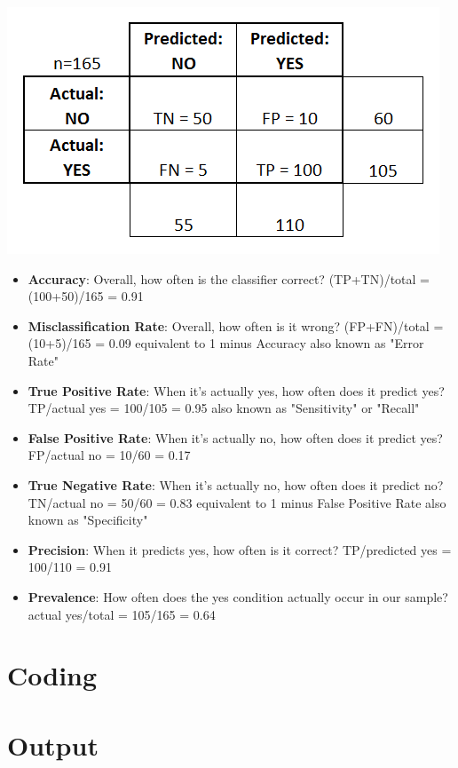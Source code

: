 \documentclass[a4paper,10pt]{article}
\begin{document}
\includegraphics[scale=0.70]{confusion_matrix.png}
\begin{itemize}
	\item \textbf{Accuracy}: Overall, how often is the classifier correct?
				(TP+TN)/total = (100+50)/165 = 0.91
     \item \textbf{Misclassification Rate}: Overall, how often is it wrong?
				(FP+FN)/total = (10+5)/165 = 0.09
                equivalent to 1 minus Accuracy
                also known as "Error Rate"
\item \textbf{True Positive Rate}: When it's actually yes, how often does it predict yes?
				TP/actual yes = 100/105 = 0.95
				also known as "Sensitivity" or "Recall"
\item \textbf{False Positive Rate}: When it's actually no, how often does it predict yes?
				FP/actual no = 10/60 = 0.17
\item \textbf{True Negative Rate}: When it's actually no, how often does it predict no?
				TN/actual no = 50/60 = 0.83
				equivalent to 1 minus False Positive Rate
				also known as "Specificity"
\item \textbf{Precision}: When it predicts yes, how often is it correct?
				TP/predicted yes = 100/110 = 0.91
\item \textbf{Prevalence}: How often does the yes condition actually occur in our sample?
				actual yes/total = 105/165 = 0.64
\end{itemize}
\section{Coding}


\section{Output} 

\end{document}
